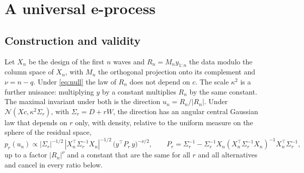 \documentclass[11pt]{article}
\theoremstyle{plain}
\theoremstyle{definition}
\begin{document}
\section{A universal e-process}
\label{sec:method}

\subsection{Construction and validity}

Let $X_n$ be the design of the first $n$ waves and $R_n = M_n y_{1:n}$ the data modulo the column space of $X_n$, with $M_n$ the orthogonal projection onto its complement and $\nu = n - q$. Under \eqref{eq:null} the law of $R_n$ does not depend on $c$. The scale $\kappa^2$ is a further nuisance: multiplying $y$ by a constant multiplies $R_n$ by the same constant. The maximal invariant under both is the direction $u_n = R_n/|R_n|$. Under $\mathcal{N}(Xc,\kappa^2\Sigma_r)$, with $\Sigma_r = D + rW$, the direction has an angular central Gaussian law that depends on $r$ only, with density, relative to the uniform measure on the sphere of the residual space,
\[
p_r(u_n) \propto |\Sigma_r|^{-1/2}\,|X_n^\top \Sigma_r^{-1} X_n|^{-1/2}\,\big(y^\top P_r\, y\big)^{-\nu/2},\qquad P_r = \Sigma_r^{-1} - \Sigma_r^{-1}X_n (X_n^\top\Sigma_r^{-1}X_n)^{-1}X_n^\top\Sigma_r^{-1},
\]
up to a factor $|R_n|^{\nu}$ and a constant that are the same for all $r$ and all alternatives and cancel in every ratio below.
\end{document}
